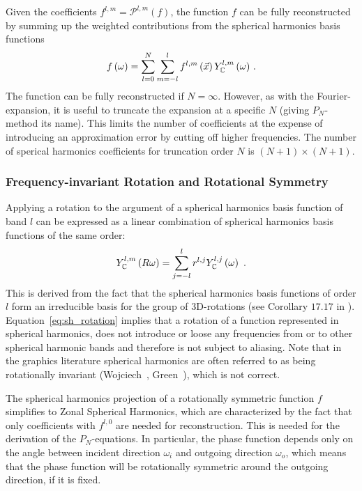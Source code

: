 Given the coefficients $f^{l, m} = \mathcal{P}^{l, m}(f)$, the function $f$ can be fully reconstructed by summing up the weighted contributions from the spherical harmonics basis functions
\begin{align}
\label{eq:sh_reconstruction}
f\left(\omega\right) = 
\sum_{l=0}^{N}
{
\sum_{m=-l}^{l}
{
f^{l,m}\left(\vec{x}\right)Y_{\mathbb{C}}^{l,m}\left(\omega\right)
}
}
\ .
\end{align}
The function can be fully reconstructed if $N=\infty$. However, as with the Fourier-expansion, it is useful to truncate the expansion at a specific $N$ (giving $P_N$-method its name). This limits the number of coefficients at the expense of introducing an approximation error by cutting off higher frequencies. The number of sperical harmonics coefficients for truncation order $N$ is $(N+1)\times(N+1)$.

\subsubsection*{Frequency-invariant Rotation and Rotational Symmetry}

Applying a rotation to the argument of a spherical harmonics basis function of band $l$ can be expressed as a linear combination of spherical harmonics basis functions of the same order:
\begin{align}
\label{eq:sh_rotation}
Y_{\mathbb{C}}^{l,m}\left(R\omega\right)=\sum_{j=-l}^{l}r^{l,j}Y_{\mathbb{C}}^{l,j}\left(\omega\right)
\ .
\end{align}
This is derived from the fact that the spherical harmonics basis functions of order $l$ form an irreducible basis for the group of 3D-rotations (see Corollary $17.17$ in \cite{Hall13}). Equation~\ref{eq:sh_rotation} implies that a rotation of a function represented in spherical harmonics, does not introduce or loose any frequencies from or to other spherical harmonic bands and therefore is not subject to aliasing. Note that in the graphics literature spherical harmonics are often referred to as being rotationally invariant (Wojciech~\cite{Wojciech08}, Green~\cite{Green03}), which is not correct.

The spherical harmonics projection of a rotationally symmetric function $f$ simplifies to Zonal Spherical Harmonics, which are characterized by the fact that only coefficients with $f^{l,0}$ are needed for reconstruction. This is needed for the derivation of the $P_N$-equations. In particular, the phase function depends only on the angle between incident direction $\omega_i$ and outgoing direction $\omega_o$, which means that the phase function will be rotationally symmetric around the outgoing direction, if it is fixed. 


